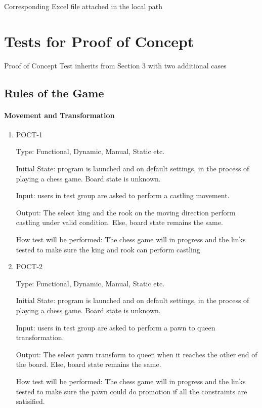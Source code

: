 \documentclass[12pt, titlepage]{article}
\begin{document}
Corresponding Excel file attached in the local path
\newpage

\section{Tests for Proof of Concept}

Proof of Concept  Test inherits from Section 3 with two additional cases

\subsection{Rules of the Game}
		
\paragraph{Movement and Transformation}

\begin{enumerate}


\item{POCT-1\\}

Type: Functional, Dynamic, Manual, Static etc.
					
Initial State: program is launched and on default settings, in the process of playing a chess game. Board state is unknown.
					
Input: users in test group are asked to perform a castling movement.
					
Output: The select king and the rook on the moving direction perform castling under valid condition. Else, board state remains the same.
					
How test will be performed:  The chess game will in progress and the links tested to make sure the king and rook can perform castling
					
\item{POCT-2\\}

Type: Functional, Dynamic, Manual, Static etc.
					
Initial State:  program is launched and on default settings, in the process of playing a chess game. Board state is unknown.
					
Input: users in test group are asked to perform a pawn to queen transformation.
					
Output: The select pawn transform to queen when it reaches the other end of the board. Else, board state remains the same.
					
How test will be performed:  The chess game will in progress and the links tested to make sure the pawn could do promotion if all the constraints are satisified. 

\end{enumerate}
\end{document}
